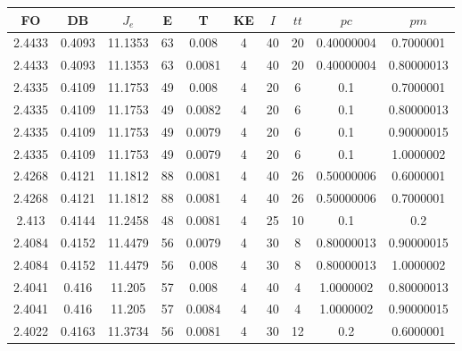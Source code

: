 \begin{table}[h!]
    \footnotesize
    \begin{center}
        \begin{tabular}{|c|c|c|c|c|c|c|c|c|c|}
        \hline
            {\bf FO} & {\bf DB} & $J_e$ & {\bf E} & {\bf T} & {\bf KE} & $I$ & $tt$ & $pc$ & $pm$ \\
        \hline
        \hline
            2.4433 & 0.4093  & 11.1353 & 63 & 0.008 & 4 & 40 & 20 & 0.40000004 & 0.7000001\\
        \hline
        \hline
            2.4433 & 0.4093  & 11.1353 & 63 & 0.0081 & 4 & 40 & 20 & 0.40000004 & 0.80000013\\
        \hline
        \hline
            2.4335 & 0.4109  & 11.1753 & 49 & 0.008 & 4 & 20 & 6 & 0.1 & 0.7000001\\
        \hline
        \hline
            2.4335 & 0.4109  & 11.1753 & 49 & 0.0082 & 4 & 20 & 6 & 0.1 & 0.80000013\\
        \hline
        \hline
            2.4335 & 0.4109  & 11.1753 & 49 & 0.0079 & 4 & 20 & 6 & 0.1 & 0.90000015\\
        \hline
        \hline
            2.4335 & 0.4109  & 11.1753 & 49 & 0.0079 & 4 & 20 & 6 & 0.1 & 1.0000002\\
        \hline
        \hline
            2.4268 & 0.4121  & 11.1812 & 88 & 0.0081 & 4 & 40 & 26 & 0.50000006 & 0.6000001\\
        \hline
        \hline
            2.4268 & 0.4121  & 11.1812 & 88 & 0.0081 & 4 & 40 & 26 & 0.50000006 & 0.7000001\\
        \hline
        \hline
            2.413 & 0.4144  & 11.2458 & 48 & 0.0081 & 4 & 25 & 10 & 0.1 & 0.2\\
        \hline
        \hline
            2.4084 & 0.4152  & 11.4479 & 56 & 0.0079 & 4 & 30 & 8 & 0.80000013 & 0.90000015\\
        \hline
        \hline
            2.4084 & 0.4152  & 11.4479 & 56 & 0.008 & 4 & 30 & 8 & 0.80000013 & 1.0000002\\
        \hline
        \hline
            2.4041 & 0.416  & 11.205 & 57 & 0.008 & 4 & 40 & 4 & 1.0000002 & 0.80000013\\
        \hline
        \hline
            2.4041 & 0.416  & 11.205 & 57 & 0.0084 & 4 & 40 & 4 & 1.0000002 & 0.90000015\\
        \hline
        \hline
            2.4022 & 0.4163  & 11.3734 & 56 & 0.0081 & 4 & 30 & 12 & 0.2 & 0.6000001\\

\end{tabular}
\end{center}
\end{table}
